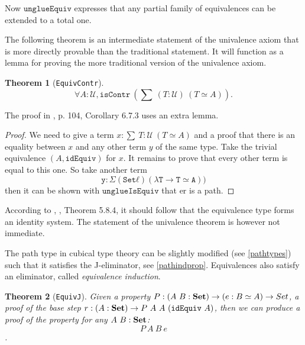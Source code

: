 \documentclass[11pt,a4paper,twoside,xetex,draft]{book}
\newcommand{\keyword}[1]{\emph{#1}\index{#1}}
\newtheorem{theorem}{Theorem}[section]
\newcommand{\op}[1]{\mathtt{#1}}
\newcommand{\type}{\mathcal{U}}
\begin{document}
Now $\op{unglueEquiv}$  expresses that any partial family of equivalences can be extended to a total one.

The following theorem is an intermediate statement of the univalence axiom that is more directly provable than the traditional statement. It will function as a lemma for proving the more traditional version of the univalence axiom.

\begin{theorem}[\texttt{EquivContr}]\label{contrSingl}
 $$\forall A : \type, \op{isContr} \ \left( \sum \ (T : \type) \  \left( T \simeq A \right) \right).$$ 
\end{theorem}


The proof in \cite{Huber2016}, p. 104, Corollary 6.7.3 uses an extra lemma.

\begin{proof}
We need to give a term $x : \sum \ T : \type \  \left( T \simeq A \right)$ and a proof that there is an equality between $x$ and any other term $y$ of the same type. Take the trivial equivalence  $(A, \op{idEquiv})$ for $x$. It remains to prove that every other term is equal to this one. So take another term $$\op{y : Σ (Set ℓ) (λ T → T ≃ A))}$$ then it can be shown with $\op{unglueIsEquiv}$ that er is a path.
\end{proof}


According to \cite{Huber2016}, \cite{Voevodsky2013}, Theorem 5.8.4, it should follow that the equivalence type forms an identity system. The statement of the univalence theorem is however not immediate.

The path type in cubical type theory can be slightly modified (see \cref{pathtypes}) such that it satisfies the J-eliminator, see \cref{pathindprop}. Equivalences also satisfy an eliminator, called \keyword{equivalence induction}. 

\begin{theorem}[\texttt{EquivJ}]
Given a property $P: (A \ B : \text{\textbf{Set}}) \rightarrow (e : B \simeq A) \rightarrow Set$, a proof of the base step $r : (A : \set) \rightarrow P \ A\ A \ (\texttt{idEquiv} \ A)$, then we can produce a proof of the property for any $A \ B: \text{\textbf{Set}}$: $$ P\  A \ B\ e$$.
\end{theorem}
\end{document}
